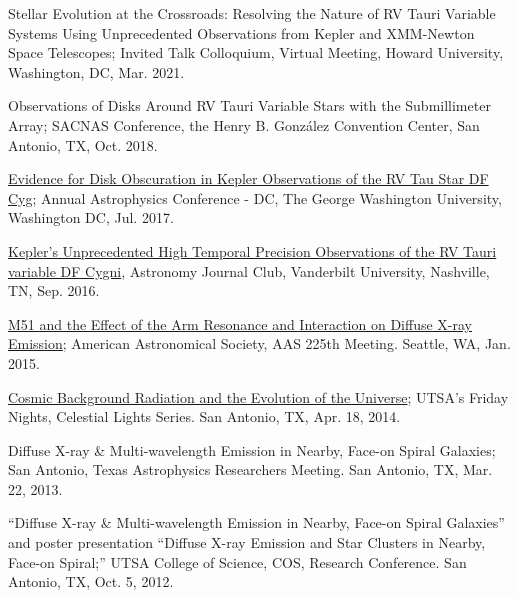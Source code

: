 \documentclass[letter,12pt]{article}
\begin{document}
\begin{etaremune}
\item Stellar Evolution at the Crossroads: Resolving the Nature of RV Tauri Variable Systems Using Unprecedented Observations from Kepler and XMM-Newton Space Telescopes; Invited Talk Colloquium, Virtual Meeting, Howard University, Washington, DC, Mar. 2021.

\item Observations of Disks Around RV Tauri Variable Stars with the Submillimeter Array; SACNAS Conference, the Henry B. Gonz\'alez Convention Center, San Antonio, TX, Oct. 2018.

\item \href{https://physics.columbian.gwu.edu/sites/g/files/zaxdzs1976/f/downloads/ACDC2017_Agenda_0.pdf}{Evidence for Disk Obscuration in Kepler Observations of the RV Tau Star DF Cyg};  Annual Astrophysics Conference - DC, The George Washington University, Washington DC, Jul. 2017.

\item \href{https://as.vanderbilt.edu/astronomy/2016/08/journal-club-fall-2016/}{Kepler's Unprecedented High Temporal Precision Observations of the RV Tauri variable DF Cygni}, Astronomy Journal Club, Vanderbilt University, Nashville, TN, Sep. 2016.

\item \href{http://adsabs.harvard.edu/abs/2015AAS...22522708V}{M51 and the Effect of the Arm Resonance and Interaction on Diffuse X-ray Emission}; American Astronomical Society, AAS 225th Meeting. Seattle, WA, Jan. 2015.

\item \href{http://www.utsa.edu/today/2014/04/celestiallights4.html}{Cosmic Background Radiation and the Evolution of the Universe}; UTSA’s Friday Nights, Celestial Lights Series. San Antonio, TX, Apr. 18, 2014.

\item Diffuse X-ray \& Multi-wavelength Emission in Nearby, Face-on Spiral Galaxies; San Antonio, Texas Astrophysics Researchers Meeting. San Antonio, TX, Mar. 22, 2013.

\item “Diffuse X-ray \& Multi-wavelength Emission in Nearby, Face-on Spiral Galaxies” and poster presentation “Diffuse X-ray Emission and Star Clusters in Nearby, Face-on Spiral;” UTSA College of Science, COS, Research Conference. San Antonio, TX, Oct. 5, 2012.

\end{etaremune}
\end{document}
